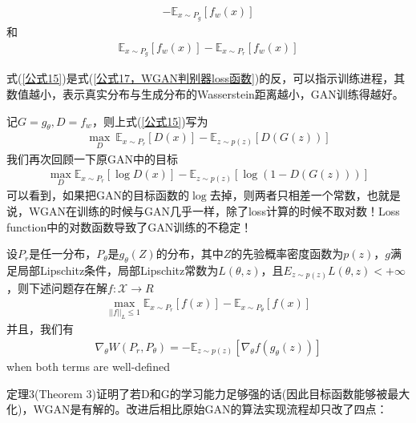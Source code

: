             \begin{align}
            \label{公式16，WGAN生成器loss函数}
            - \mathbb{E}_{x \sim P_g} [f_w(x)]
            \end{align}
            和
            \begin{align}
            \label{公式17，WGAN判别器loss函数}
            \mathbb{E}_{x \sim P_g} [f_w(x)]- \mathbb{E}_{x \sim P_r} [f_w(x)]
            \end{align}
            \par
            式(\ref{公式15})是式(\ref{公式17，WGAN判别器loss函数})的反，可以指示训练进程，其数值越小，表示真实分布与生成分布的Wasserstein距离越小，GAN训练得越好。
            \par
            记$G = g_\theta,D = f_w$，则上式(\ref{公式15})写为
            \begin{align*}
            \max_D\  \mathbb{E}_{x\sim P_r}[D(x)] - \mathbb{E}_{z\sim p(z)}[D(G(z))]
            \end{align*}
            我们再次回顾一下原GAN中的目标
            \begin{align*}
            \max_D \mathbb{E}_{x\sim P_r}[\log D(x)] - \mathbb{E}_{z\sim p(z)}[\log (1-D(G(z)))]
            \end{align*}
            可以看到，如果把GAN的目标函数的$\log$去掉，则两者只相差一个常数，也就是说，WGAN在训练的时候与GAN几乎一样，除了loss计算的时候不取对数！Loss function中的对数函数导致了GAN训练的不稳定！
            \begin{theorem}[Theorem 3]
            设$P_r$是任一分布，$P_\theta$是$g_\theta(Z)$的分布，其中$Z$的先验概率密度函数为$p(z)$，$g$满足局部Lipschitz条件，局部Lipschitz常数为$L(\theta,z)$，且$E_{z\sim p(z)} L(\theta,z)<+\infty $，则下述问题存在解$f:\mathcal{X}\to R$
            \begin{align*}
            \max _{||f||_L \leqslant 1} \mathbb{E}_{x\sim P_r}[f(x)] - \mathbb{E}_{x\sim P_\theta }[f(x)]
            \end{align*}
            并且，我们有
            \begin{align*}
            \nabla_\theta W(P_r,P_\theta) = -\mathbb{E}_{z\sim p(z)}[\nabla _\theta f(g_\theta(z))]
            \end{align*}
            when both terms are well-defined
            \end{theorem}
            \par
            定理3(Theorem 3)证明了若D和G的学习能力足够强的话(因此目标函数能够被最大化)，WGAN是有解的。改进后相比原始GAN的算法实现流程却只改了四点：
